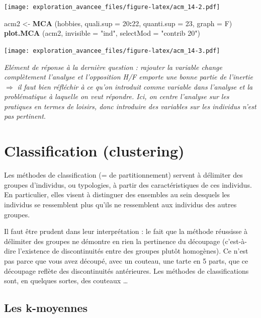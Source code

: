 \documentclass[]{book}
\newenvironment{Shaded}{\begin{snugshade}}{\end{snugshade}}
\newcommand{\DataTypeTok}[1]{\textcolor[rgb]{0.13,0.29,0.53}{#1}}
\newcommand{\DecValTok}[1]{\textcolor[rgb]{0.00,0.00,0.81}{#1}}
\newcommand{\KeywordTok}[1]{\textcolor[rgb]{0.13,0.29,0.53}{\textbf{#1}}}
\newcommand{\NormalTok}[1]{#1}
\newcommand{\OperatorTok}[1]{\textcolor[rgb]{0.81,0.36,0.00}{\textbf{#1}}}
\newcommand{\StringTok}[1]{\textcolor[rgb]{0.31,0.60,0.02}{#1}}
\begin{document}
\texttt{[image: exploration\_avancee\_files/figure-latex/acm\_14-2.pdf]}

\begin{Shaded}
\begin{Highlighting}[]
\NormalTok{acm2 <-}\StringTok{ }\KeywordTok{MCA}\NormalTok{ (hobbies, }\DataTypeTok{quali.sup =} \DecValTok{20}\OperatorTok{:}\DecValTok{22}\NormalTok{, }\DataTypeTok{quanti.sup =} \DecValTok{23}\NormalTok{, }\DataTypeTok{graph =}\NormalTok{ F)}
\KeywordTok{plot.MCA}\NormalTok{ (acm2, }\DataTypeTok{invisible =} \StringTok{"ind"}\NormalTok{, }\DataTypeTok{selectMod =} \StringTok{"contrib 20"}\NormalTok{)}
\end{Highlighting}
\end{Shaded}

\texttt{[image: exploration\_avancee\_files/figure-latex/acm\_14-3.pdf]}

\emph{Elément de réponse à la dernière question : rajouter la variable change complètement l'analyse et l'opposition H/F emporte une bonne partie de l'inertie} \(\Rightarrow\) \emph{il faut bien réfléchir à ce qu'on introduit comme variable dans l'analyse et la problématique à laquelle on veut répondre. Ici, on centre l'analyse sur les pratiques en termes de loisirs, donc introduire des variables sur les individus n'est pas pertinent}.

\hypertarget{classification-clustering}{%
\chapter{Classification (clustering)}\label{classification-clustering}}

Les méthodes de classification (= de partitionnement) servent à délimiter des groupes d'individus, ou typologies, à partir des caractéristiques de ces individus. En particulier, elles visent à distinguer des ensembles au sein desquels les individus se ressemblent plus qu'ils ne ressemblent aux individus des autres groupes.

Il faut être prudent dans leur interprétation : le fait que la méthode réussisse à délimiter des groupes ne démontre en rien la pertinence du découpage (c'est-à-dire l'existence de discontinuités entre des groupes plutôt homogènes). Ce n'est pas parce que vous avez découpé, avec un couteau, une tarte en 5 parts, que ce découpage reflète des discontinuités antérieures. Les méthodes de classifications sont, en quelques sortes, des couteaux \ldots{}

\hypertarget{les-k-moyennes}{%
\section{Les k-moyennes}\label{les-k-moyennes}}
\end{document}
